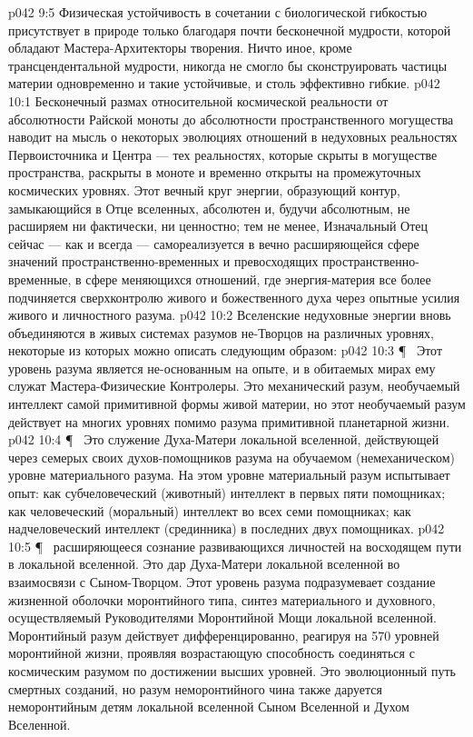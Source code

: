 \vs p042 9:5 Физическая устойчивость в сочетании с биологической гибкостью присутствует в природе только благодаря почти бесконечной мудрости, которой обладают Мастера\hyp{}Архитекторы творения. Ничто иное, кроме трансцендентальной мудрости, никогда не смогло бы сконструировать частицы материи одновременно и такие устойчивые, и столь эффективно гибкие.
\vs p042 10:1 Бесконечный размах относительной космической реальности от абсолютности Райской моноты до абсолютности пространственного могущества наводит на мысль о некоторых эволюциях отношений в недуховных реальностях Первоисточника и Центра --- тех реальностях, которые скрыты в могуществе пространства, раскрыты в моноте и временно открыты на промежуточных космических уровнях. Этот вечный круг энергии, образующий контур, замыкающийся в Отце вселенных, абсолютен и, будучи абсолютным, не расширяем ни фактически, ни ценностно; тем не менее, Изначальный Отец сейчас --- как и всегда --- самореализуется в вечно расширяющейся сфере значений пространственно\hyp{}временных и превосходящих пространственно\hyp{}временные, в сфере меняющихся отношений, где энергия\hyp{}материя все более подчиняется сверхконтролю живого и божественного духа через опытные усилия живого и личностного разума.
\vs p042 10:2 Вселенские недуховные энергии вновь объединяются в живых системах разумов не\hyp{}Творцов на различных уровнях, некоторые из которых можно описать следующим образом:
\vs p042 10:3 \P\ \bibnobreakspace {} Этот уровень разума является не\hyp{}основанным на опыте, и в обитаемых мирах ему служат Мастера\hyp{}Физические Контролеры. Это механический разум, необучаемый интеллект самой примитивной формы живой материи, но этот необучаемый разум действует на многих уровнях помимо разума примитивной планетарной жизни.
\vs p042 10:4 \P\ \bibnobreakspace {} Это служение Духа\hyp{}Матери локальной вселенной, действующей через семерых своих духов\hyp{}помощников разума на обучаемом (немеханическом) уровне материального разума. На этом уровне материальный разум испытывает опыт: как субчеловеческий (животный) интеллект в первых пяти помощниках; как человеческий (моральный) интеллект во всех семи помощниках; как надчеловеческий интеллект (срединника) в последних двух помощниках.
\vs p042 10:5 \P\ \bibnobreakspace {} расширяющееся сознание развивающихся личностей на восходящем пути в локальной вселенной. Это дар Духа\hyp{}Матери локальной вселенной во взаимосвязи с Сыном\hyp{}Творцом. Этот уровень разума подразумевает создание жизненной оболочки моронтийного типа, синтез материального и духовного, осуществляемый Руководителями Моронтийной Мощи локальной вселенной. Моронтийный разум действует дифференцированно, реагируя на 570 уровней моронтийной жизни, проявляя возрастающую способность соединяться с космическим разумом по достижении высших уровней. Это эволюционный путь смертных созданий, но разум неморонтийного чина также даруется неморонтийным детям локальной вселенной Сыном Вселенной и Духом Вселенной.
